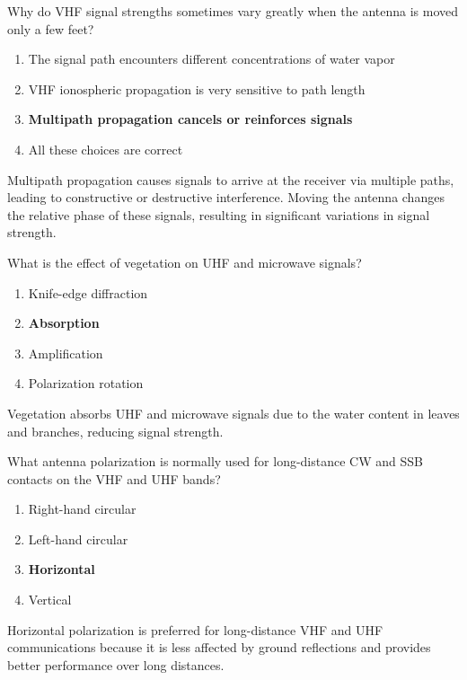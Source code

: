 \begin{tcolorbox}[colback=gray!10!white,colframe=black!75!black,title={T3A01}]
    Why do VHF signal strengths sometimes vary greatly when the antenna is moved only a few feet?
    \begin{enumerate}[label=\Alph*,noitemsep]
        \item The signal path encounters different concentrations of water vapor
        \item VHF ionospheric propagation is very sensitive to path length
        \item \textbf{Multipath propagation cancels or reinforces signals}
        \item All these choices are correct
    \end{enumerate}
\end{tcolorbox}
Multipath propagation causes signals to arrive at the receiver via multiple paths, leading to constructive or destructive interference. Moving the antenna changes the relative phase of these signals, resulting in significant variations in signal strength.


\begin{tcolorbox}[colback=gray!10!white,colframe=black!75!black,title={T3A02}]
    What is the effect of vegetation on UHF and microwave signals?
    \begin{enumerate}[label=\Alph*,noitemsep]
        \item Knife-edge diffraction
        \item \textbf{Absorption}
        \item Amplification
        \item Polarization rotation
    \end{enumerate}
\end{tcolorbox}
Vegetation absorbs UHF and microwave signals due to the water content in leaves and branches, reducing signal strength.


\begin{tcolorbox}[colback=gray!10!white,colframe=black!75!black,title={T3A03}]
    What antenna polarization is normally used for long-distance CW and SSB contacts on the VHF and UHF bands?
    \begin{enumerate}[label=\Alph*,noitemsep]
        \item Right-hand circular
        \item Left-hand circular
        \item \textbf{Horizontal}
        \item Vertical
    \end{enumerate}
\end{tcolorbox}
Horizontal polarization is preferred for long-distance VHF and UHF communications because it is less affected by ground reflections and provides better performance over long distances.

